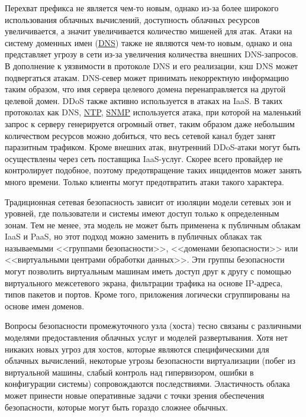 Перехват префикса не является чем-то новым, однако из-за более широкого использования облачных вычислений, доступность облачных ресурсов увеличивается, а значит увеличивается количество мишеней для атак.
Атаки на систему доменных имен (\hyperlink{dns}{DNS}) также не являются чем-то новым, однако и она представляет угрозу в сети из-за увеличения количества внешних DNS-запросов.
В дополнение к уязвимости в протоколе DNS и его реализации, кэш DNS может подвергаться атакам.
DNS-север может принимать некорректную информацию таким образом, что имя сервера целевого домена перенаправляется на другой целевой домен.
DDoS также активно используется в атаках на IaaS.
В таких протоколах как DNS, \hyperlink{ntp}{NTP}, \hyperlink{snmp}{SNMP} используется атака, при которой на маленький запрос к серверу генерируется огромный ответ, таким образом даже небольшим количеством ресурсов можно добиться, что весь сетевой канал будет занят паразитным трафиком.
Кроме внешних атак, внутренний DDoS-атаки могут быть осуществлены через сеть поставщика IaaS-услуг.
Скорее всего провайдер не контролирует подобное, поэтому предотвращение таких инцидентов может занять много времени.
Только клиенты могут предотвратить атаки такого характера.

Традиционная сетевая безопасность зависит от изоляции модели сетевых зон и уровней, где пользователи и системы имеют доступ только к определенным зонам.
Тем не менее, эта модель не может быть применена к публичным облакам IaaS и PaaS, но этот подход можно заменить в публичных облаках так называемыми <<группами безопасности>>, <<доменами безопасности>> или <<виртуальными центрами обработки данных>>.
Эти группы безопасности могут позволить виртуальным машинам иметь доступ друг к другу с помощью виртуального межсетевого экрана, фильтрации трафика на основе IP-адреса, типов пакетов и портов.
Кроме того, приложения логически сгруппированы на основе имен доменов.

Вопросы безопасности промежуточного узла (хоста) тесно связаны с различными моделями предоставления облачных услуг и моделей развертывания.
Хотя нет никаких новых угроз для хостов, которые являются специфическими для облачных вычислений, некоторые угрозы безопасности виртуализации (побег из виртуальной машины, слабый контроль над гипервизором, ошибки в конфигурации системы) сопровождаются последствиями.
Эластичность облака может принести новые оперативные задачи с точки зрения обеспечения безопасности, которые могут быть гораздо сложнее обычных.

